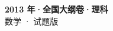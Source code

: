 \documentclass[zihao=-4, a4paper]{ctexart}
\begin{document}
\begin{center}
  {\Large\bfseries 2013 年·全国大纲卷·理科}\\[4pt]
  {\large 数学 · 试题版}
\end{center}
\medskip
{}

\end{document}
